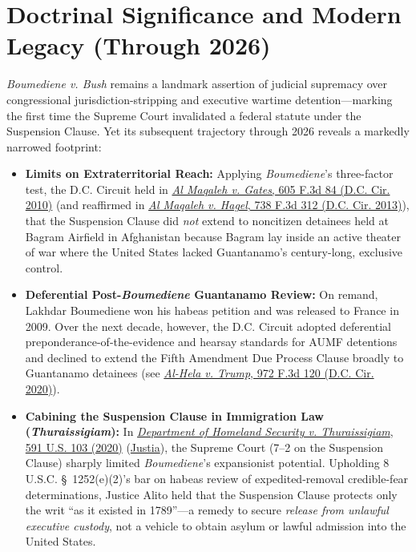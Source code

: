 \documentclass[12pt]{article}
\begin{document}
\section{Doctrinal Significance and Modern Legacy (Through 2026)}
\textit{Boumediene v. Bush} remains a landmark assertion of judicial supremacy over congressional jurisdiction-stripping and executive wartime detention---marking the first time the Supreme Court invalidated a federal statute under the Suspension Clause. Yet its subsequent trajectory through 2026 reveals a markedly narrowed footprint:
\begin{itemize}
  \item \textbf{Limits on Extraterritorial Reach:} Applying \textit{Boumediene}'s three-factor test, the D.C. Circuit held in \href{https://caselaw.findlaw.com/court/us-dc-circuit/1524965.html}{\textit{Al Maqaleh v. Gates}, 605 F.3d 84 (D.C. Cir. 2010)} (and reaffirmed in \href{https://law.justia.com/cases/federal/appellate-courts/cadc/12-5404/12-5404-2013-12-24.html}{\textit{Al Maqaleh v. Hagel}, 738 F.3d 312 (D.C. Cir. 2013)}), that the Suspension Clause did \textit{not} extend to noncitizen detainees held at Bagram Airfield in Afghanistan because Bagram lay inside an active theater of war where the United States lacked Guantanamo's century-long, exclusive control.
  \item \textbf{Deferential Post-\textit{Boumediene} Guantanamo Review:} On remand, Lakhdar Boumediene won his habeas petition and was released to France in 2009. Over the next decade, however, the D.C. Circuit adopted deferential preponderance-of-the-evidence and hearsay standards for AUMF detentions and declined to extend the Fifth Amendment Due Process Clause broadly to Guantanamo detainees (see \href{https://law.justia.com/cases/federal/appellate-courts/cadc/19-5079/19-5079-2020-08-28.html}{\textit{Al-Hela v. Trump}, 972 F.3d 120 (D.C. Cir. 2020)}).
  \item \textbf{Cabining the Suspension Clause in Immigration Law (\textit{Thuraissigiam}):} In \href{https://www.law.cornell.edu/supremecourt/text/19-161}{\textit{Department of Homeland Security v. Thuraissigiam}, 591 U.S. 103 (2020)} (\href{https://supreme.justia.com/cases/federal/us/591/19-161/}{Justia}), the Supreme Court (7--2 on the Suspension Clause) sharply limited \textit{Boumediene}'s expansionist potential. Upholding 8 U.S.C. \S~1252(e)(2)'s bar on habeas review of expedited-removal credible-fear determinations, Justice Alito held that the Suspension Clause protects only the writ ``as it existed in 1789''---a remedy to secure \textit{release from unlawful executive custody}, not a vehicle to obtain asylum or lawful admission into the United States.

\end{itemize}
\end{document}
